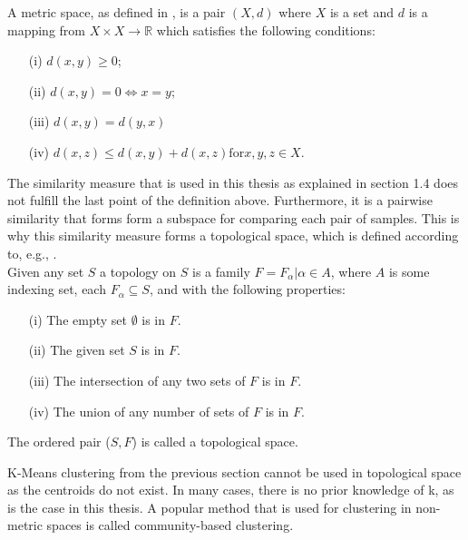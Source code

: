 \documentclass[thesis=B,english]{FITthesis}[2012/10/20]
\begin{document}
A metric space, as defined in \cite{choudhary1992elements}, is a pair $(X, d)$ where $X$ is a set and $d$ is a mapping from  $X \times X \to \mathbb{R}$ which satisfies the following conditions:
\begin{enumerate}
    \item [(i)] $d(x, y) \geq 0$;
    \item [(ii)] $d(x, y) = 0 \iff x = y$;
    \item [(iii)] $d(x, y) = d(y, x)$
    \item [(iv)] $d(x, z) \leq d(x, y) + d(x, z) \mathrm{for} x, y, z \in X$.
\end{enumerate}

The similarity measure that is used in this thesis as explained in section 1.4  does not fulfill the last point of the definition above. Furthermore, it is a pairwise similarity that forms form a subspace for comparing each pair of samples.
This is why this similarity measure forms a topological space, which is defined according to, e.g., \cite{stahl2014introduction}. \\

Given any set $S$ a topology on $S$ is a family $F ={F_{\alpha} | \alpha \in A}$, where $A$ is some indexing set, each $F_{\alpha}  \subseteq S$, and with the following properties:
\begin{enumerate}
    \item [(i)] The empty set $\emptyset$ is in $F$.
    \item [(ii)] The given set $S$ is in $F$.
    \item [(iii)] The intersection of any two sets of $F$ is in $F$.
    \item [(iv)] The union of any number of sets of $F$ is in $F$.
\end{enumerate}
The ordered pair ($S, F$) is called a topological space. \\


K-Means clustering from the previous section cannot be used in topological space as the centroids do not exist.
In many cases, there is no prior knowledge of k, as is the case in this thesis.
A popular method that is used for clustering in non-metric spaces is called community-based clustering. \\
\end{document}
